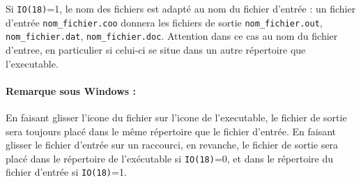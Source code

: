 Si \lstinline{IO(18)}=1, le nom des fichiers est adapté au nom du fichier d'entrée : un fichier d'entrée \lstinline{nom_fichier.coo} donnera les fichiers de sortie \lstinline{nom_fichier.out}, \lstinline{nom_fichier.dat}, \lstinline{nom_fichier.doc}.
Attention dans ce cas au nom du fichier d'entree, en particulier si celui-ci se situe dans un autre répertoire que l'executable. 

\paragraph{Remarque sous Windows :}
En faisant glisser l'icone du fichier sur l'icone de l'executable, le fichier de sortie sera toujours placé dans le même répertoire que le fichier d'entrée. 
En faisant glisser le fichier d'entrée sur un raccourci, en revanche, le fichier de sortie sera placé dans le répertoire de l'exécutable si \lstinline{IO(18)}=0, et dans le répertoire du fichier d'entrée si \lstinline{IO(18)}=1.
